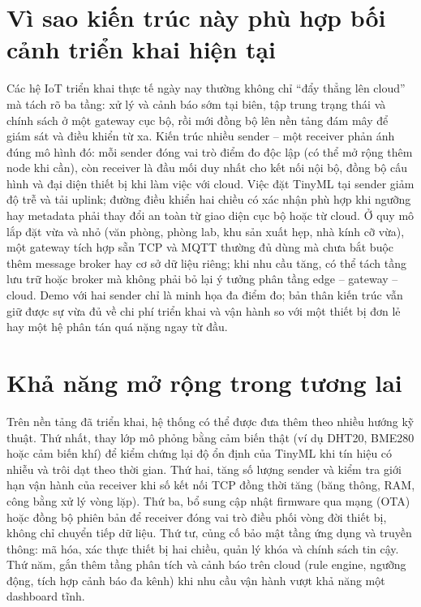 \documentclass[12pt,a4paper]{report}
\begin{document}
\section{Vì sao kiến trúc này phù hợp bối cảnh triển khai hiện tại}
Các hệ IoT triển khai thực tế ngày nay thường không chỉ ``đẩy thẳng lên cloud'' mà tách rõ ba tầng: xử lý và cảnh báo sớm tại biên, tập trung trạng thái và chính sách ở một gateway cục bộ, rồi mới đồng bộ lên nền tảng đám mây để giám sát và điều khiển từ xa. Kiến trúc nhiều sender -- một receiver phản ánh đúng mô hình đó: mỗi sender đóng vai trò điểm đo độc lập (có thể mở rộng thêm node khi cần), còn receiver là đầu mối duy nhất cho kết nối nội bộ, đồng bộ cấu hình và đại diện thiết bị khi làm việc với cloud. Việc đặt TinyML tại sender giảm độ trễ và tải uplink; đường điều khiển hai chiều có xác nhận phù hợp khi ngưỡng hay metadata phải thay đổi an toàn từ giao diện cục bộ hoặc từ cloud. Ở quy mô lắp đặt vừa và nhỏ (văn phòng, phòng lab, khu sản xuất hẹp, nhà kính cỡ vừa), một gateway tích hợp sẵn TCP và MQTT thường đủ dùng mà chưa bắt buộc thêm message broker hay cơ sở dữ liệu riêng; khi nhu cầu tăng, có thể tách tầng lưu trữ hoặc broker mà không phải bỏ lại ý tưởng phân tầng edge -- gateway -- cloud. Demo với hai sender chỉ là minh họa đa điểm đo; bản thân kiến trúc vẫn giữ được sự vừa đủ về chi phí triển khai và vận hành so với một thiết bị đơn lẻ hay một hệ phân tán quá nặng ngay từ đầu.

\section{Khả năng mở rộng trong tương lai}
Trên nền tảng đã triển khai, hệ thống có thể được đưa thêm theo nhiều hướng kỹ thuật. Thứ nhất, thay lớp mô phỏng bằng cảm biến thật (ví dụ DHT20, BME280 hoặc cảm biến khí) để kiểm chứng lại độ ổn định của TinyML khi tín hiệu có nhiễu và trôi dạt theo thời gian. Thứ hai, tăng số lượng sender và kiểm tra giới hạn vận hành của receiver khi số kết nối TCP đồng thời tăng (băng thông, RAM, công bằng xử lý vòng lặp). Thứ ba, bổ sung cập nhật firmware qua mạng (OTA) hoặc đồng bộ phiên bản để receiver đóng vai trò điều phối vòng đời thiết bị, không chỉ chuyển tiếp dữ liệu. Thứ tư, củng cố bảo mật tầng ứng dụng và truyền thông: mã hóa, xác thực thiết bị hai chiều, quản lý khóa và chính sách tin cậy. Thứ năm, gắn thêm tầng phân tích và cảnh báo trên cloud (rule engine, ngưỡng động, tích hợp cảnh báo đa kênh) khi nhu cầu vận hành vượt khả năng một dashboard tĩnh.
\end{document}
